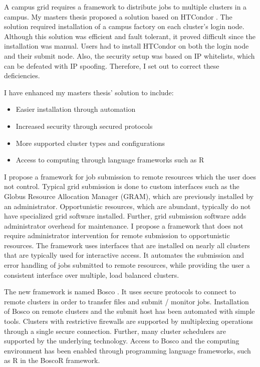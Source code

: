 A campus grid requires a framework to distribute jobs to multiple clusters in a campus.  My masters thesis \cite{weitzel2011campus} proposed a solution based on HTCondor \cite{litzkow1988condor}.  The solution required installation of a campus factory \cite{website:campusfactory} on each cluster's login node.  Although this solution was efficient and fault tolerant, it proved difficult since the installation was manual.  Users had to install HTCondor on both the login node and their submit node.  Also, the security setup was based on IP whitelists, which can be defeated with IP spoofing.  Therefore, I set out to correct these deficiencies.

I have enhanced my masters thesis' solution to include:
\begin{itemize}
\item Easier installation through automation
\item Increased security through secured protocols
\item More supported cluster types and configurations
\item Access to computing through language frameworks such as R \cite{team2005r}
\end{itemize}

I propose a framework for job submission to remote resources which the user does not control.  Typical grid submission is done to custom interfaces such as the Globus Resource Allocation Manager \cite{foster1999globus} (GRAM), which are previously installed by an administrator.  Opportunistic resources, which are abundant, typically do not have specialized grid software installed.  Further, grid submission software adds administrator overhead for maintenance.  I propose a framework that does not require administrator intervention for remote submission to opportunistic resources.  The framework uses interfaces that are installed on nearly all clusters that are typically used for interactive access.  It automates the submission and error handling of jobs submitted to remote resources, while providing the user a consistent interface over multiple, load balanced clusters.

The new framework is named Bosco \cite{chep2013weitzel}.  It uses secure protocols to connect to remote clusters in order to transfer files and submit / monitor jobs.  Installation of Bosco on remote clusters and the submit host has been automated with simple tools.  Clusters with restrictive firewalls are supported by multiplexing operations through a single secure connection.  Further, many cluster schedulers are supported by the underlying technology.  Access to Bosco and the computing environment has been enabled through programming language frameworks, such as R in the BoscoR  framework.

